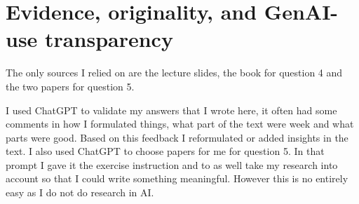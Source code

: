 \documentclass[11pt]{article}
\begin{document}
\section{Evidence, originality, and GenAI-use transparency}
The only sources I relied on are the lecture slides, the book for question 4 and the two papers for question 5.

I used ChatGPT to validate my answers that I wrote here, it often had some comments in how I formulated things, what part of the text were week and what parts were good. Based on this feedback I reformulated or added insights in the text. I also used ChatGPT to choose papers for me for question 5. In that prompt I gave it the exercise instruction and to as well take my research into account so that I could write something meaningful. However this is no entirely easy as I do not do research in AI.


\printbibliography
\end{document}
